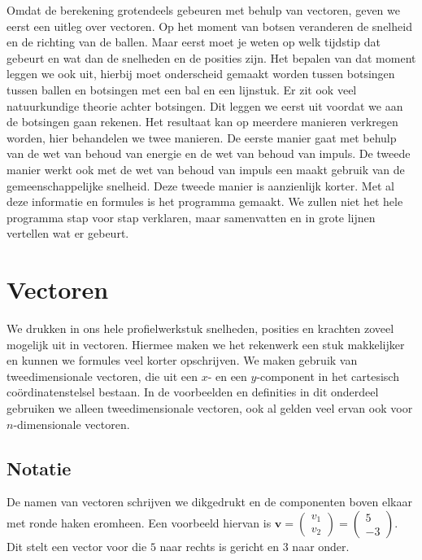 \documentclass[12pt,a4paper]{article}
\begin{document}
	Omdat de berekening grotendeels gebeuren met behulp van vectoren, geven we eerst een uitleg over vectoren. Op het moment van botsen veranderen de snelheid en de richting van de ballen. Maar eerst moet je weten op welk tijdstip dat gebeurt en wat dan de snelheden en de posities zijn. Het bepalen van dat moment leggen we ook uit, hierbij moet onderscheid gemaakt worden tussen botsingen tussen ballen en botsingen met een bal en een lijnstuk. Er zit ook veel natuurkundige theorie achter botsingen. Dit leggen we eerst uit voordat we aan de botsingen gaan rekenen. Het resultaat kan op meerdere manieren verkregen worden, hier behandelen we twee manieren. De eerste manier gaat met behulp van de wet van behoud van energie en de wet van behoud van impuls. De tweede manier werkt ook met de wet van behoud van impuls een maakt gebruik van de gemeenschappelijke snelheid. Deze tweede manier is aanzienlijk korter. Met al deze informatie en formules is het programma gemaakt. We zullen niet het hele programma stap voor stap verklaren, maar samenvatten en in grote lijnen vertellen wat er gebeurt.

	\newpage
	
	\section{Vectoren}
	We drukken in ons hele profielwerkstuk snelheden, posities en krachten zoveel mogelijk uit in vectoren. Hiermee maken we het rekenwerk een stuk makkelijker en kunnen we formules veel korter opschrijven. We maken gebruik van tweedimensionale vectoren, die uit een $x$- en een $y$-component in het cartesisch co\"{o}rdinatenstelsel bestaan. In de voorbeelden en definities in dit onderdeel gebruiken we alleen tweedimensionale vectoren, ook al gelden veel ervan ook voor $n$-dimensionale vectoren.
	
	\subsection{Notatie}
	De namen van vectoren schrijven we dikgedrukt en de componenten boven elkaar met ronde haken eromheen. Een voorbeeld hiervan is $\mathbf{v} = \begin{pmatrix} v_1 \\ v_2 \end{pmatrix} = \begin{pmatrix} 5 \\ -3 \end{pmatrix}$. Dit stelt een vector voor die $5$ naar rechts is gericht en $3$ naar onder.
	
\end{document}

